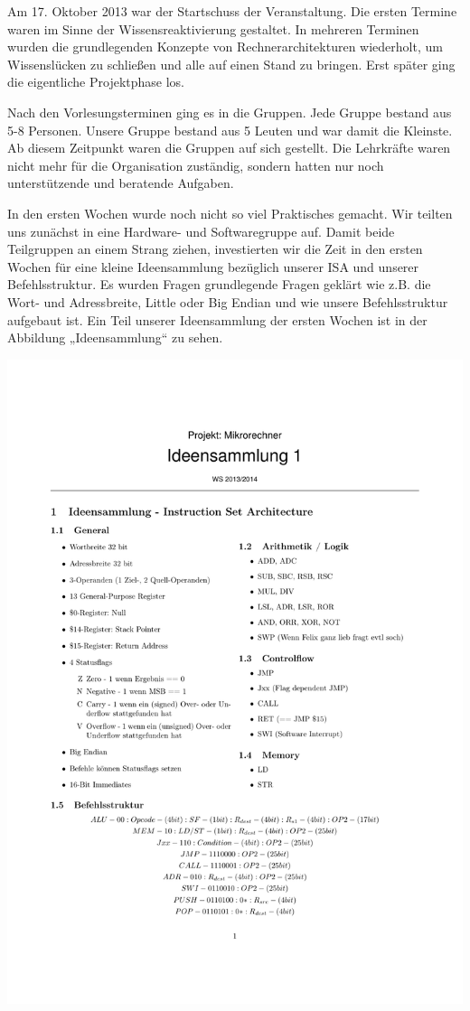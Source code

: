 Am 17. Oktober 2013 war der Startschuss der Veranstaltung. Die ersten Termine waren im Sinne der Wissensreaktivierung gestaltet. In mehreren Terminen wurden die grundlegenden Konzepte von Rechnerarchitekturen wiederholt, um Wissenslücken zu schließen und alle auf einen Stand zu bringen. Erst später ging die eigentliche Projektphase los.

Nach den Vorlesungsterminen ging es in die Gruppen. Jede Gruppe bestand aus 5-8 Personen. Unsere Gruppe bestand aus 5 Leuten und war damit die Kleinste. Ab diesem Zeitpunkt waren die Gruppen auf sich gestellt. Die Lehrkräfte waren nicht mehr für die Organisation zuständig, sondern hatten nur noch unterstützende und beratende Aufgaben.

In den ersten Wochen wurde noch nicht so viel Praktisches gemacht. Wir teilten uns zunächst in eine Hardware- und Softwaregruppe auf. Damit beide Teilgruppen an einem Strang ziehen, investierten wir die Zeit in den ersten Wochen für eine kleine Ideensammlung bezüglich unserer ISA und unserer Befehlsstruktur. Es wurden Fragen grundlegende Fragen geklärt wie z.B. die Wort- und Adressbreite, Little oder Big Endian und wie unsere Befehlsstruktur aufgebaut ist. Ein Teil unserer Ideensammlung der ersten Wochen ist in der Abbildung „Ideensammlung“ zu sehen.

\includegraphics{images/Ideensammlung}

